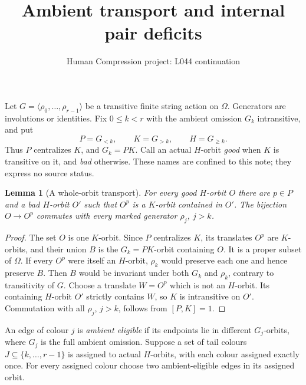 \documentclass[11pt,a4paper]{article}
\title{Ambient transport and internal pair deficits}
\author{Human Compression project: L044 continuation}
\date{}
\newtheorem{lemma}{Lemma}
\newcommand{\gen}[1]{\langle#1\rangle}
\begin{document}
\maketitle
Let $G=\gen{\rho_0,\ldots,\rho_{r-1}}$ be a transitive finite
string action on $\Omega$. Generators are involutions or identities.
Fix $0\le k<r$ with the ambient omission $G_k$ intransitive, and put
\[
 P=G_{<k},\qquad K=G_{>k},\qquad H=G_{\ge k}.
\]
Thus $P$ centralizes $K$, and $G_k=PK$. Call an actual $H$-orbit
\emph{good} when $K$ is transitive on it, and \emph{bad} otherwise.
These names are confined to this note; they express no source status.

\begin{lemma}[A whole-orbit transport]\label{move}
For every good $H$-orbit $O$ there are $p\in P$ and a bad
$H$-orbit $O'$ such that $O^p$ is a $K$-orbit contained in $O'$.
The bijection $O\longrightarrow O^p$ commutes with every marked
generator $\rho_j$, $j>k$.
\end{lemma}
\begin{proof}
The set $O$ is one $K$-orbit. Since $P$ centralizes $K$, its
translates $O^p$ are $K$-orbits, and their union $B$ is the
$G_k=PK$-orbit containing $O$. It is a proper subset of $\Omega$.
If every $O^p$ were itself an $H$-orbit, $\rho_k$ would preserve
each one and hence preserve $B$. Then $B$ would be invariant under
both $G_k$ and $\rho_k$, contrary to transitivity of $G$.
Choose a translate $W=O^p$ which is not an $H$-orbit. Its containing
$H$-orbit $O'$ strictly contains $W$, so $K$ is intransitive on $O'$.
Commutation with all $\rho_j$, $j>k$, follows from $[P,K]=1$.
\end{proof}

An edge of colour $j$ is \emph{ambient eligible} if its endpoints
lie in different $G_j$-orbits, where $G_j$ is the full ambient
omission. Suppose a set of tail colours
$J\subseteq\{k,\ldots,r-1\}$ is assigned to actual $H$-orbits,
with each colour assigned exactly once. For every assigned colour
choose two ambient-eligible edges in its assigned orbit.
\end{document}
